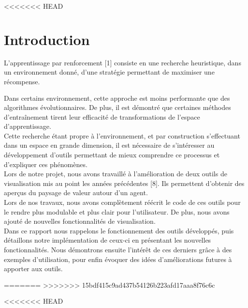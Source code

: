 \documentclass[12pt]{article}
\begin{document}
\newpage																		
<<<<<<< HEAD

\setlength{\parindent}{2ex}

\section*{Introduction}

L’apprentissage par renforcement [1] consiste en une recherche heuristique, dans un environnement donné, d’une stratégie permettant de maximiser une récompense. \par

Dans certains environnement, cette approche est moins performante que des algorithmes évolutionnaires. De plus, il est démontré que certaines méthodes d’entraînement tirent leur efficacité de transformations de l’espace d’apprentissage. \\

Cette recherche étant propre à l’environnement, et par construction s’effectuant dans un espace en grande dimension, il est nécessaire de s’intéresser au développement d’outils permettant de mieux comprendre ce processus et d’expliquer ces phénomènes. \\

Lors de notre projet, nous avons travaillé à l’amélioration de deux outils de visualisation mis au point les années précédentes [8]. Ils permettent d’obtenir des aperçus du paysage de valeur autour d’un agent. \\

Lors de nos travaux, nous avons complètement réécrit le code de ces outils pour le rendre plus modulable et plus clair pour l’utilisateur. De plus, nous avons ajouté de nouvelles fonctionnalités de visualisation. \\

Dans ce rapport nous rappelons le fonctionnement des outils développés, puis détaillons notre implémentation de ceux-ci en présentant les nouvelles fonctionnalités. Nous démontrons ensuite l'intérêt de ces derniers grâce à des exemples d'utilisation, pour enfin évoquer des idées d'améliorations futures à apporter aux outils. \\

\newpage

=======
>>>>>>> 15bdf415c9ad437b54126b223afd17aaa8f76c6c
\renewcommand*\contentsname{Table des Matières}
\tableofcontents 

\newpage
<<<<<<< HEAD
\end{document}
